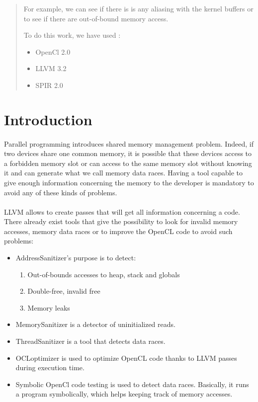 \documentclass{article}
\begin{document}
\begin{abstract}
    For example, we can see if there is is any aliasing with the kernel buffers or to see if there are out-of-bound memory access. 

To do this work, we have used :
\begin{itemize}
\item OpenCl 2.0
\item LLVM 3.2
\item SPIR 2.0
\end{itemize}

\end{abstract}


\section{Introduction}

\paragraph{}
Parallel programming introduces shared memory management problem. Indeed, if two devices share one common  memory, it is possible that these devices access to a forbidden memory slot or can access to the same memory slot without knowing it and can generate what we call memory data races. Having a tool capable to give enough information concerning the memory to the developer is mandatory to avoid any of these kinds of problems. 

\paragraph{}
LLVM allows to create passes that will get all information concerning a code. There already exist tools that give the possibility to look for invalid memory accesses, memory data races or to improve the OpenCL code to avoid such problems: 
\begin{itemize}
\item AddressSanitizer's \cite{moll2014bounds} purpose is to detect:
    \begin{enumerate}
    \item Out-of-bounds accesses to heap, stack and globals
    \item Double-free, invalid free
    \item Memory leaks
    \end{enumerate}
\item MemorySanitizer \cite{43308} is a detector of uninitialized reads.
\item ThreadSanitizer \cite{threadsanitizer} is a tool that detects data races.
\item OCLoptimizer \cite{fabeiro2013ocloptimizer} is used to optimize OpenCL code thanks to LLVM passes during execution time.
\item Symbolic OpenCl code testing \cite{collingbourne2012symbolic} is used to detect data races. Basically, it runs a program symbolically, which helps keeping track of memory accesses.
\end{itemize}
\end{document}
